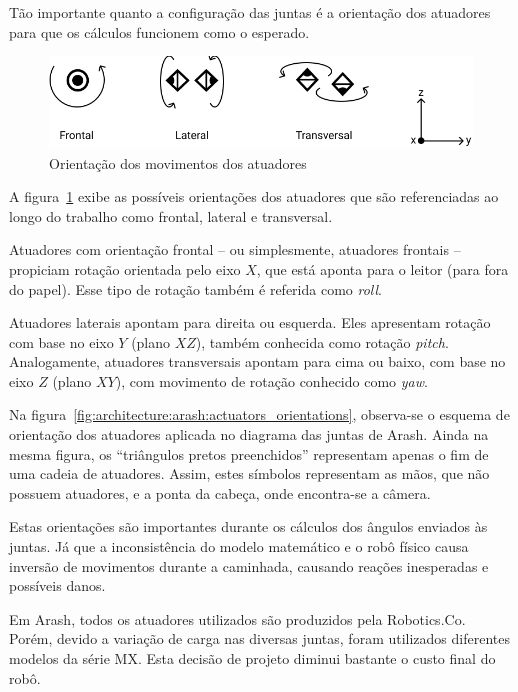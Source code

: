 Tão importante quanto a configuração das juntas é a orientação dos atuadores para que os cálculos funcionem como o esperado.

\begin{figure}[htb]
	\centering
	\includegraphics[scale=1]{imagens/svg/actuators-orientation}
	\caption{Orientação dos movimentos dos atuadores}
	\label{fig:ActuatorsOrientation}
\end{figure}

A figura~\ref{fig:ActuatorsOrientation} exibe as possíveis orientações dos atuadores que são referenciadas ao longo do trabalho como frontal, lateral e transversal.

Atuadores com orientação frontal -- ou simplesmente, atuadores frontais -- propiciam rotação orientada pelo eixo $X$, que está aponta para o leitor (para fora do papel). Esse tipo de rotação também é referida como \textit{roll}.

Atuadores laterais apontam para direita ou esquerda. Eles apresentam rotação com base no eixo $Y$ (plano $XZ$), também conhecida como rotação \textit{pitch}. Analogamente, atuadores transversais apontam para cima ou baixo, com base no eixo $Z$ (plano $XY$), com movimento de rotação conhecido como \textit{yaw}.

Na figura~\ref{fig:architecture:arash:actuators_orientations}, observa-se o esquema de orientação dos atuadores aplicada no diagrama das juntas de Arash. Ainda na mesma figura, os ``triângulos pretos preenchidos'' representam apenas o fim de uma cadeia de atuadores. Assim, estes símbolos representam as mãos, que não possuem atuadores, e a ponta da cabeça, onde encontra-se a câmera. 

Estas orientações são importantes durante os cálculos dos ângulos enviados às juntas. Já que a inconsistência do modelo matemático e o robô físico causa inversão de movimentos durante a caminhada, causando reações inesperadas e possíveis danos.

Em Arash, todos os atuadores utilizados são produzidos pela Robotics.Co. Porém, devido a variação de carga nas diversas juntas, foram utilizados diferentes  modelos da série MX. Esta decisão de projeto diminui bastante o custo final do robô.

